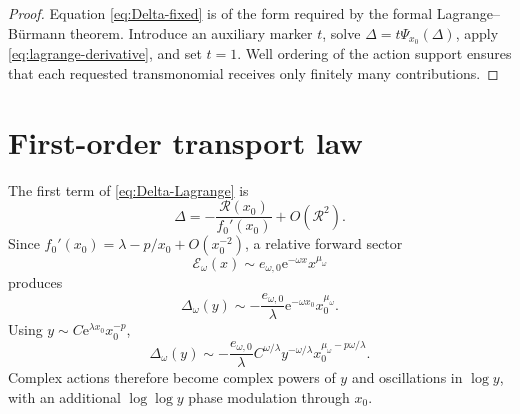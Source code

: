 \documentclass[11pt,a4paper,oneside,openany]{book}
\theoremstyle{definition}
\theoremstyle{remark}
\newcommand{\e}{\mathrm e}
\begin{document}
\begin{proof}
Equation \cref{eq:Delta-fixed} is of the form required by the formal
Lagrange--B\"urmann theorem.  Introduce an auxiliary marker $t$, solve
$\Delta=t\Psi_{x_0}(\Delta)$, apply
\cref{eq:lagrange-derivative}, and set $t=1$.  Well ordering of the action
support ensures that each requested transmonomial receives only finitely many
contributions.
\end{proof}

\section{First-order transport law}
The first term of \cref{eq:Delta-Lagrange} is
\begin{equation}
 \Delta=-\frac{\mathcal R(x_0)}{f_0'(x_0)}+O(\mathcal R^2).
 \label{eq:first-sector-transport}
\end{equation}
Since $f_0'(x_0)=\lambda-p/x_0+O(x_0^{-2})$, a relative forward sector
\begin{equation}
 \mathcal E_\omega(x)
 \sim e_{\omega,0}\e^{-\omega x}x^{\mu_\omega}
 \label{eq:E-one}
\end{equation}
produces
\begin{equation}
 \Delta_\omega(y)
 \sim-\frac{e_{\omega,0}}{\lambda}
 \e^{-\omega x_0}x_0^{\mu_\omega}.
 \label{eq:Delta-one-x0}
\end{equation}
Using $y\sim C\e^{\lambda x_0}x_0^{-p}$,
\begin{equation}
 \boxed{
 \Delta_\omega(y)
 \sim-\frac{e_{\omega,0}}{\lambda}
 C^{\omega/\lambda}y^{-\omega/\lambda}
 x_0^{\mu_\omega-p\omega/\lambda}.}
 \label{eq:Delta-one-y}
\end{equation}
Complex actions therefore become complex powers of $y$ and oscillations in
$\log y$, with an additional $\log\log y$ phase modulation through $x_0$.
\end{document}
